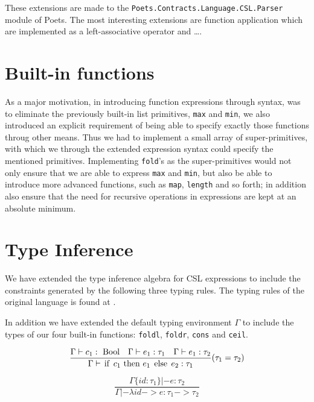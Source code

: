 \documentclass[10pt,a4paper,final,oneside,openany,article]{memoir}
\newcommand{\kw}[1]{\text{\lstinline{#1}}}
\begin{document}
These extensions are made to the
\texttt{Poets.Contracts.Language.CSL.Parser} module of Poets. The most
interesting extensions are function application which are implemented
as a left-associative operator and \ldots.  

\section{Built-in functions}
As a major motivation, in introducing function expressions through
syntax, was to eliminate the previously built-in list primitives,
\lstinline{max} and \lstinline{min}, we also introduced an explicit
requirement of being able to specify exactly those functions throug
other means. Thus we had to implement a small array of super-primitives,
with which we through the extended expression syntax could specify the
mentioned primitives. Implementing \lstinline{fold}'s as the
super-primitives would not only ensure that we are able to express 
\lstinline{max} and \lstinline{min}, but also be able to introduce more
advanced functions, such as \lstinline{map}, \lstinline{length} and so 
forth; in addition also ensure that the need for recursive operations
in expressions are kept at an absolute minimum.

\section{Type Inference}
We have extended the type inference algebra for CSL expressions to
include the constraints generated by the following three typing
rules. The typing rules of the original language is found at
\cite[page 17, Figure 3]{hvitved10}.  

In addition we have extended the default typing environment $\Gamma$
to include the types of our four built-in functions:
\lstinline{foldl}, \lstinline{foldr}, \lstinline{cons} and
\lstinline{ceil}.

\begin{equation*}
\frac{
  \Gamma |- c_1 : ~\kw{Bool}
  \quad \Gamma |- e_1 : \tau_1
  \quad \Gamma |- e_1 : \tau_2
}{
  \Gamma |- \kw{if}~ c_1 ~\kw{then}~ e_1 ~\kw{else}~ e_2 : \tau_1
}(\tau_1=\tau_2)\label{eq:type_cond}
\end{equation*}

\begin{equation*}
\frac{
  \Gamma\{id : \tau_1\} |- e : \tau_2
}{
  \Gamma |- \lambda id -> e : \tau_1 -> \tau_2
}\label{eq:type_lambda}
\end{equation*}
\end{document}
